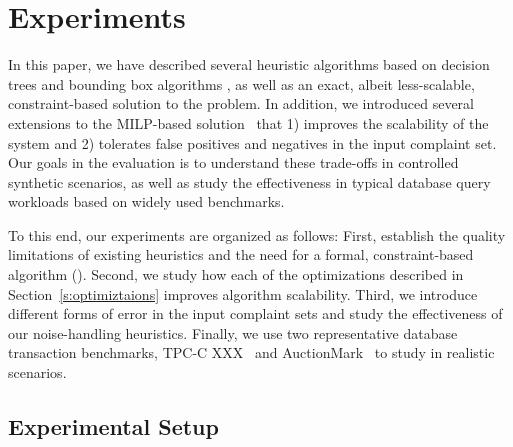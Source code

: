 
%
%
%
%
%
\section{Experiments}

In this paper, we have described several heuristic algorithms based on decision trees 
and bounding box algorithms , as well as an exact, albeit less-scalable,
constraint-based solution to the \prob problem.  In addition, we 
introduced  several extensions to the MILP-based solution~ that 
1) improves the scalability of the system and 2) tolerates false positives and 
negatives in the input complaint set.
Our goals in the evaluation is to understand these trade-offs in
controlled synthetic scenarios, as well as study the effectiveness
in typical database query workloads based on widely used benchmarks.

To this end, our experiments are organized as follows: First, 
establish the quality limitations of existing heuristics and the need for a formal, 
constraint-based algorithm (\exact).  Second, we study how each of the 
optimizations described in Section~\ref{s:optimiztaions} improves algorithm scalability.
Third, we introduce different forms of error in the input complaint sets and study the 
effectiveness of our noise-handling heuristics.  Finally, we use two
representative database transaction benchmarks, TPC-C XXX~\cite{tpcc} and AuctionMark~\cite{auctionmark}
to study \sys in realistic scenarios. 




%
%

\subsection{Experimental Setup}


